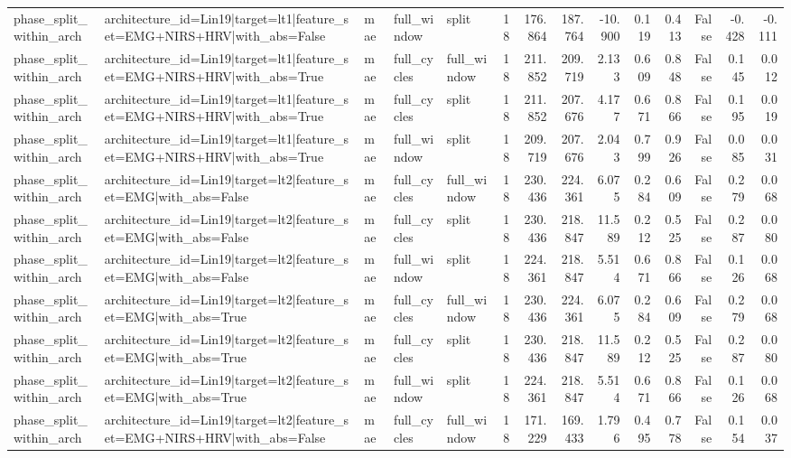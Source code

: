 \begin{table}
\begin{tabular}{lllllrrrrrrrrr}
phase_split_within_arch & architecture_id=Lin19|target=lt1|feature_set=EMG+NIRS+HRV|with_abs=False & mae & full_window & split & 18 & 176.864 & 187.764 & -10.900 & 0.119 & 0.413 & False & -0.428 & -0.111 \\
phase_split_within_arch & architecture_id=Lin19|target=lt1|feature_set=EMG+NIRS+HRV|with_abs=True & mae & full_cycles & full_window & 18 & 211.852 & 209.719 & 2.133 & 0.609 & 0.848 & False & 0.145 & 0.012 \\
phase_split_within_arch & architecture_id=Lin19|target=lt1|feature_set=EMG+NIRS+HRV|with_abs=True & mae & full_cycles & split & 18 & 211.852 & 207.676 & 4.177 & 0.671 & 0.866 & False & 0.195 & 0.019 \\
phase_split_within_arch & architecture_id=Lin19|target=lt1|feature_set=EMG+NIRS+HRV|with_abs=True & mae & full_window & split & 18 & 209.719 & 207.676 & 2.043 & 0.799 & 0.926 & False & 0.085 & 0.031 \\
phase_split_within_arch & architecture_id=Lin19|target=lt2|feature_set=EMG|with_abs=False & mae & full_cycles & full_window & 18 & 230.436 & 224.361 & 6.075 & 0.284 & 0.609 & False & 0.279 & 0.068 \\
phase_split_within_arch & architecture_id=Lin19|target=lt2|feature_set=EMG|with_abs=False & mae & full_cycles & split & 18 & 230.436 & 218.847 & 11.589 & 0.212 & 0.525 & False & 0.287 & 0.080 \\
phase_split_within_arch & architecture_id=Lin19|target=lt2|feature_set=EMG|with_abs=False & mae & full_window & split & 18 & 224.361 & 218.847 & 5.514 & 0.671 & 0.866 & False & 0.126 & 0.068 \\
phase_split_within_arch & architecture_id=Lin19|target=lt2|feature_set=EMG|with_abs=True & mae & full_cycles & full_window & 18 & 230.436 & 224.361 & 6.075 & 0.284 & 0.609 & False & 0.279 & 0.068 \\
phase_split_within_arch & architecture_id=Lin19|target=lt2|feature_set=EMG|with_abs=True & mae & full_cycles & split & 18 & 230.436 & 218.847 & 11.589 & 0.212 & 0.525 & False & 0.287 & 0.080 \\
phase_split_within_arch & architecture_id=Lin19|target=lt2|feature_set=EMG|with_abs=True & mae & full_window & split & 18 & 224.361 & 218.847 & 5.514 & 0.671 & 0.866 & False & 0.126 & 0.068 \\
phase_split_within_arch & architecture_id=Lin19|target=lt2|feature_set=EMG+NIRS+HRV|with_abs=False & mae & full_cycles & full_window & 18 & 171.229 & 169.433 & 1.796 & 0.495 & 0.778 & False & 0.154 & 0.037 \\

\end{tabular}
\end{table}
